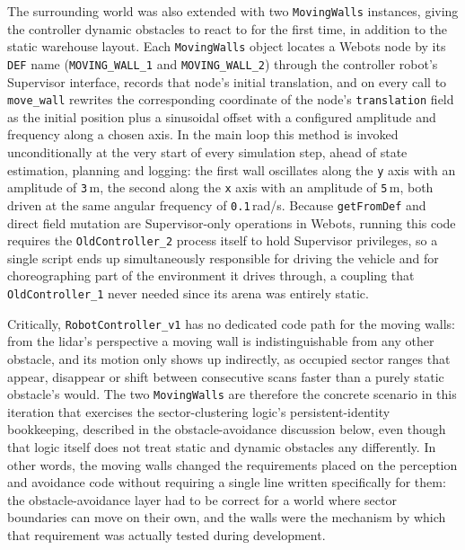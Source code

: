 The surrounding world was also extended with two \texttt{MovingWalls} instances, giving the controller dynamic obstacles to react to for the first time, in addition to the static warehouse layout. Each \texttt{MovingWalls} object locates a Webots node by its \texttt{DEF} name (\texttt{MOVING\_WALL\_1} and \texttt{MOVING\_WALL\_2}) through the controller robot's Supervisor interface, records that node's initial translation, and on every call to \texttt{move\_wall} rewrites the corresponding coordinate of the node's \texttt{translation} field as the initial position plus a sinusoidal offset with a configured amplitude and frequency along a chosen axis. In the main loop this method is invoked unconditionally at the very start of every simulation step, ahead of state estimation, planning and logging: the first wall oscillates along the \texttt{y} axis with an amplitude of \texttt{3}\,m, the second along the \texttt{x} axis with an amplitude of \texttt{5}\,m, both driven at the same angular frequency of \texttt{0.1}\,rad/s. Because \texttt{getFromDef} and direct field mutation are Supervisor-only operations in Webots, running this code requires the \texttt{OldController\_2} process itself to hold Supervisor privileges, so a single script ends up simultaneously responsible for driving the vehicle and for choreographing part of the environment it drives through, a coupling that \texttt{OldController\_1} never needed since its arena was entirely static.

Critically, \texttt{RobotController\_v1} has no dedicated code path for the moving walls: from the lidar's perspective a moving wall is indistinguishable from any other obstacle, and its motion only shows up indirectly, as occupied sector ranges that appear, disappear or shift between consecutive scans faster than a purely static obstacle's would. The two \texttt{MovingWalls} are therefore the concrete scenario in this iteration that exercises the sector-clustering logic's persistent-identity bookkeeping, described in the obstacle-avoidance discussion below, even though that logic itself does not treat static and dynamic obstacles any differently. In other words, the moving walls changed the requirements placed on the perception and avoidance code without requiring a single line written specifically for them: the obstacle-avoidance layer had to be correct for a world where sector boundaries can move on their own, and the walls were the mechanism by which that requirement was actually tested during development.

